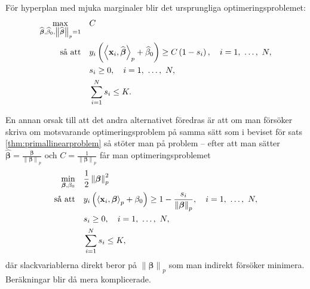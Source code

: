 \documentclass[a4paper, 12pt]{report}
\theoremstyle{definition}
\theoremstyle{remark}
\newcommand{\bfbeta}{{\boldsymbol{\beta}}}
\newcommand{\bfx}{\mathbf{x}}
\newcommand{\llangle}{\left\langle}
\newcommand{\rrangle}{\right\rangle}
\newcommand{\inner}[2]{\llangle #1, #2 \rrangle}
\begin{document}
För hyperplan med mjuka marginaler blir det ursprungliga optimeringsproblemet:
\begin{equation}\label{opt:softmargin}
\begin{aligned}
\operatornamewithlimits{max}_{\widehat{\bfbeta}, \widehat{\beta}_0, \left\|\widehat{\bfbeta}
\right\|_p=1}& & &C\\
\text{så att}& & &y_i\left(\inner{\bfx_i}{\widehat{\bfbeta}}_p+\widehat{\beta}_0\right)\geq C\left(1-s_i\right),\quad i=1,~\dots,~N,\\
& & &s_i\geq0,\quad i=1,~\dots,~N,\\
& & &\sum_{i=1}^{N}s_i \leq K.
\end{aligned}
\end{equation}

En annan orsak till att det andra alternativet föredras är att om man försöker skriva om motsvarande optimeringsproblem på samma sätt som i beviset för sats \ref{thm:primallinearproblem} så stöter man på problem -- efter att man sätter $\widehat{\bfbeta}=\frac{\bfbeta}{\left\|\bfbeta
\right\|_p}$ och $C=\frac{1}{\left\|\bfbeta
\right\|_p}$ får man optimeringsproblemet
\begin{equation*}
\begin{aligned}
\operatornamewithlimits{min}_{\bfbeta, \beta_0} & & &\frac{1}{2}\left\|\bfbeta
\right\|_p^2\\
\text{så att} & & &y_i\left(\inner{\bfx_i}{\bfbeta}_p+\beta_0\right)\geq 1 - \frac{s_i}{\left\|\bfbeta\right\|_p},\quad i=1,~\dots,~N,\\
& & &s_i\geq0,\quad i=1,~\dots,~N,\\
& & &\sum_{i=1}^{N} s_i \leq K,
\end{aligned}
\end{equation*}
där slackvariablerna direkt beror på $\left\|\bfbeta\right\|_p$ som man indirekt försöker minimera. Beräkningar blir då mera komplicerade.
\end{document}
